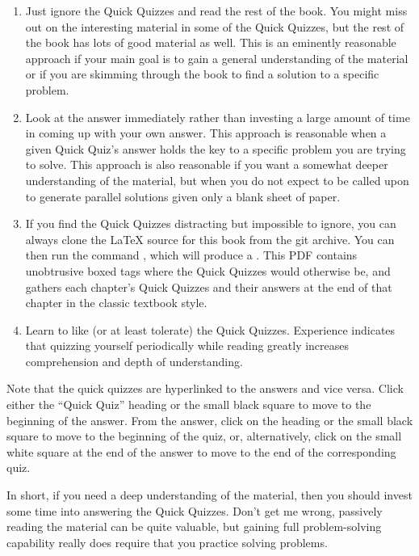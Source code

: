 {{\begin{enumerate}
\item	Just ignore the Quick Quizzes and read the rest of
	the book.
	You might miss out on the interesting material in
	some of the Quick Quizzes, but the rest of the book
	has lots of good material as well.
	This is an eminently reasonable approach if your main
	goal is to gain a general understanding of the material
	or if you are skimming through the book to find a
	solution to a specific problem.
\item	Look at the answer immediately rather than investing
	a large amount of time in coming up with your own
	answer.
	This approach is reasonable when a given Quick Quiz's
	answer holds the key to a specific problem you are
	trying to solve.
	This approach is also reasonable if you want a somewhat
	deeper understanding of the material, but when you do not
	expect to be called upon to generate parallel solutions given
	only a blank sheet of paper.
\item	If you find the Quick Quizzes distracting but impossible
	to ignore, you can always clone the \LaTeX{} source for
	this book from the git archive.
	You can then run the command , which will
	produce a .
	This PDF contains unobtrusive boxed tags where the Quick Quizzes
	would otherwise be, and gathers each chapter's Quick Quizzes
	and their answers at the end of that chapter in the
	classic textbook style.
\item	Learn to like (or at least tolerate) the Quick Quizzes.
	Experience indicates that quizzing yourself periodically
	while reading greatly increases comprehension and depth
	of understanding.
\end{enumerate}

Note that the quick quizzes are hyperlinked to the answers and vice versa.
Click either the ``Quick Quiz'' heading or the small black square
to move to the beginning of the answer.
From the answer, click on the heading or the small black square to
move to the beginning of the quiz, or, alternatively, click on the
small white square at the end of the answer to move to the end of the
corresponding quiz.
}\QuickQuizEndE
}

In short, if you need a deep
understanding of the material, then you should invest some time
into answering the Quick Quizzes.
Don't get me wrong, passively reading the material can be quite
valuable, but gaining full problem-solving capability really
does require that you practice solving problems.

